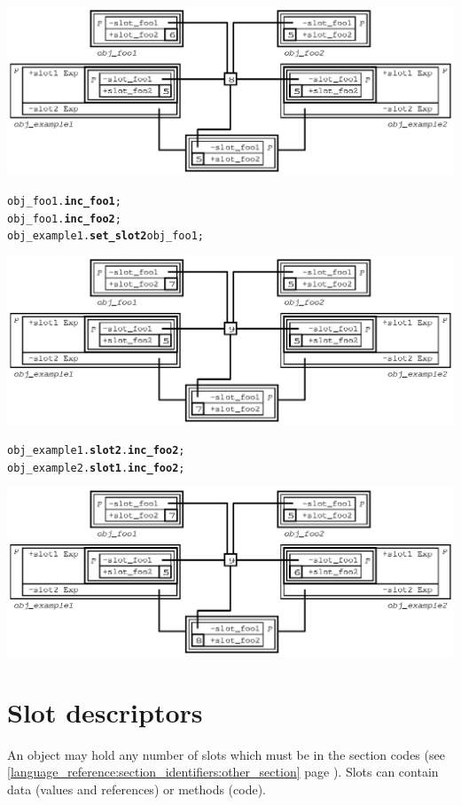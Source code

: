 \documentclass[11pt]{mybook}
\begin{document}
\begin{alltt}
\begin{center}
\includegraphics[scale=1.0]{figures/expanded_slot6}
\end{center}
   obj_foo1.{\bf{}inc\_foo1};
   obj_foo1.{\bf{}inc\_foo2};
   obj_example1.{\bf{}set\_slot2} obj_foo1;
\begin{center}
\includegraphics[scale=1.0]{figures/expanded_slot7}
\end{center}
   obj_example1.{\bf{}slot2}.{\bf{}inc\_foo2};
   obj_example2.{\bf{}slot1}.{\bf{}inc\_foo2};
\begin{center}
\includegraphics[scale=1.0]{figures/expanded_slot8}
\end{center}
\end{alltt}

\section{Slot descriptors}
\label{language_reference:slot_descriptors}
%
An object may hold any number of slots which must be in the section codes (see {\ref{language_reference:section_identifiers:other_section}} page \pageref{language_reference:section_identifiers:other_section}).
Slots can contain data (values and references) or methods (code).
\end{document}
